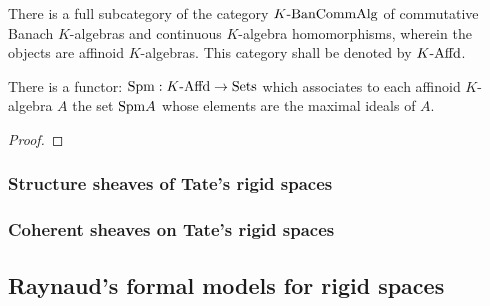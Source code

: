             \begin{corollary}
                There is a full subcategory of the category $K\text{-}\mathrm{Ban}\mathrm{Comm}\mathrm{Alg}$ of commutative Banach $K$-algebras and continuous $K$-algebra homomorphisms, wherein the objects are affinoid $K$-algebras. This category shall be denoted by $K\text{-}\mathrm{Affd}$.
            \end{corollary}
            \begin{proposition} \label{prop: maximal_spectra_of_affinoid_algebras}
                There is a functor: $\mathrm{Spm}: K\text{-}\mathrm{Affd} \to \mathrm{Sets}$ which associates to each affinoid $K$-algebra $A$ the set $\mathrm{Spm} A$ whose elements are the maximal ideals of $A$. 
            \end{proposition}
                \begin{proof}
                    
                \end{proof}
        
        \subsubsection{Structure sheaves of Tate's rigid spaces}
        
        \subsubsection{Coherent sheaves on Tate's rigid spaces}
    
    \subsection{Raynaud's formal models for rigid spaces}
